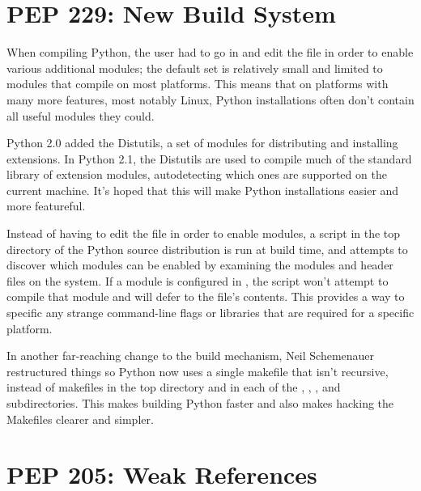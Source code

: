 \documentclass{howto}
\begin{document}
\section{PEP 229: New Build System}

When compiling Python, the user had to go in and edit the
 file in order to enable various additional
modules; the default set is relatively small and limited to modules
that compile on most \UNIX{} platforms.  This means that on \Unix{}
platforms with many more features, most notably Linux, Python
installations often don't contain all useful modules they could.

Python 2.0 added the Distutils, a set of modules for distributing and
installing extensions.  In Python 2.1, the Distutils are used to
compile much of the standard library of extension modules,
autodetecting which ones are supported on the current machine.  It's
hoped that this will make Python installations easier and more
featureful.

Instead of having to edit the  file in order to
enable modules, a  script in the top directory of the
Python source distribution is run at build time, and attempts to
discover which modules can be enabled by examining the modules and
header files on the system.  If a module is configured in
, the  script won't attempt to
compile that module and will defer to the  file's
contents.  This provides a way to specific any strange command-line
flags or libraries that are required for a specific platform.

In another far-reaching change to the build mechanism, Neil
Schemenauer restructured things so Python now uses a single makefile
that isn't recursive, instead of makefiles in the top directory and in
each of the , , , and
 subdirectories.  This makes building Python faster
and also makes hacking the Makefiles clearer and simpler.

\begin{seealso} 


\end{seealso}

\section{PEP 205: Weak References}
\end{document}
